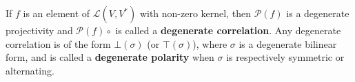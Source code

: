 If $f$ is an element of $\mathcal{L}(V, V^*)$ with non-zero kernel, then $\mathcal{P}(f)$ is a degenerate projectivity and $\mathcal{P}(f) \circ$ is called a \textbf{degenerate correlation}. Any degenerate correlation is of the form $\bot(\sigma)$ (or $\top(\sigma)$), where $\sigma$ is a degenerate bilinear form, and is called a \textbf{degenerate polarity} when $\sigma$ is respectively symmetric or alternating.
